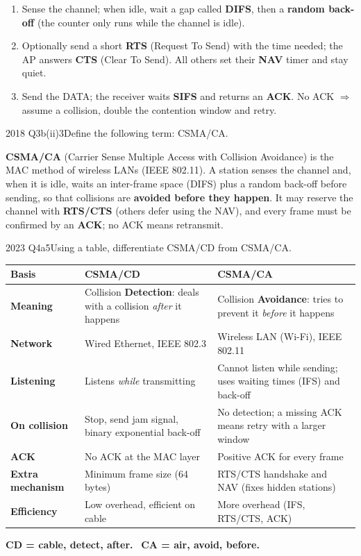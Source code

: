 \documentclass[10pt]{article}
\begin{document}
\begin{enumerate}
\item Sense the channel; when idle, wait a gap called \textbf{DIFS}, then a \textbf{random back-off} (the counter only runs while the channel is idle).
\item Optionally send a short \textbf{RTS} (Request To Send) with the time needed; the AP answers \textbf{CTS} (Clear To Send). All others set their \textbf{NAV} timer and stay quiet.
\item Send the DATA; the receiver waits \textbf{SIFS} and returns an \textbf{ACK}. No ACK $\Rightarrow$ assume a collision, double the contention window and retry.
\end{enumerate}

\begin{pastq}{2018 Q3b(ii)}{3}Define the following term: CSMA/CA.\end{pastq}
\begin{ans}
\textbf{CSMA/CA} (Carrier Sense Multiple Access with Collision Avoidance) is the MAC method of wireless LANs (IEEE 802.11).
A station senses the channel and, when it is idle, waits an inter-frame space (DIFS) plus a random back-off before sending, so that collisions are \textbf{avoided before they happen}.
It may reserve the channel with \textbf{RTS/CTS} (others defer using the NAV), and every frame must be confirmed by an \textbf{ACK}; no ACK means retransmit.
\end{ans}

\begin{pastq}{2023 Q4a}{5}Using a table, differentiate CSMA/CD from CSMA/CA.\end{pastq}
\begin{ans}
\small
\begin{tabularx}{\linewidth}{@{}>{\bfseries}p{2.3cm}XX@{}}
\toprule
Basis & CSMA/CD & CSMA/CA\\\midrule
Meaning & Collision \textbf{Detection}: deals with a collision \emph{after} it happens & Collision \textbf{Avoidance}: tries to prevent it \emph{before} it happens\\
Network & Wired Ethernet, IEEE 802.3 & Wireless LAN (Wi-Fi), IEEE 802.11\\
Listening & Listens \emph{while} transmitting & Cannot listen while sending; uses waiting times (IFS) and back-off\\
On collision & Stop, send jam signal, binary exponential back-off & No detection; a missing ACK means retry with a larger window\\
ACK & No ACK at the MAC layer & Positive ACK for every frame\\
Extra mechanism & Minimum frame size (64 bytes) & RTS/CTS handshake and NAV (fixes hidden stations)\\
Efficiency & Low overhead, efficient on cable & More overhead (IFS, RTS/CTS, ACK)\\
\bottomrule
\end{tabularx}
\end{ans}
\begin{mnemonic}
\textbf{CD = cable, detect, after.} \ \textbf{CA = air, avoid, before.}
\end{mnemonic}
\end{document}
